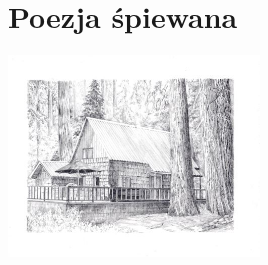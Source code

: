 \documentclass[11pt, twoside]{book}
\begin{document}
\chapter{Poezja śpiewana}
\begin{center}
    \includegraphics[width=0.5\textwidth]{images/chatka.jpg}
\end{center}
\pagestyle{poezja}
\newpage\pagestyle{poezja}

\newpage\pagestyle{poezja}








\newpage\pagestyle{poezja}

\end{document}
